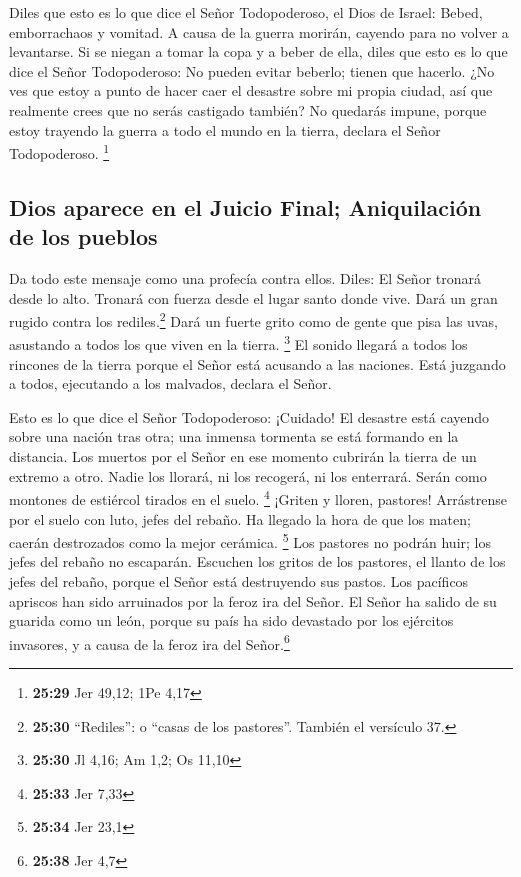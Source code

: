  Diles que esto es lo que dice el Señor Todopoderoso, el
Dios de Israel: Bebed, emborrachaos y vomitad. A causa de la guerra
morirán, cayendo para no volver a levantarse.  Si se
niegan a tomar la copa y a beber de ella, diles que esto es lo que dice
el Señor Todopoderoso: No pueden evitar beberlo; tienen que hacerlo.
 ¿No ves que estoy a punto de hacer caer el desastre
sobre mi propia ciudad, así que realmente crees que no serás castigado
también? No quedarás impune, porque estoy trayendo la guerra a todo el
mundo en la tierra, declara el Señor Todopoderoso. \footnote{\textbf{25:29}
  Jer 49,12; 1Pe 4,17}

\hypertarget{dios-aparece-en-el-juicio-final-aniquilaciuxf3n-de-los-pueblos}{%
\subsection{Dios aparece en el Juicio Final; Aniquilación de los
pueblos}\label{dios-aparece-en-el-juicio-final-aniquilaciuxf3n-de-los-pueblos}}

 Da todo este mensaje como una profecía contra ellos.
Diles: El Señor tronará desde lo alto. Tronará con fuerza desde el lugar
santo donde vive. Dará un gran rugido contra los rediles.\footnote{\textbf{25:30}
  ``Rediles'': o ``casas de los pastores''. También el versículo 37.}
Dará un fuerte grito como de gente que pisa las uvas, asustando a todos
los que viven en la tierra. \footnote{\textbf{25:30} Jl 4,16; Am 1,2; Os
  11,10}  El sonido llegará a todos los rincones de la
tierra porque el Señor está acusando a las naciones. Está juzgando a
todos, ejecutando a los malvados, declara el Señor.

 Esto es lo que dice el Señor Todopoderoso: ¡Cuidado! El
desastre está cayendo sobre una nación tras otra; una inmensa tormenta
se está formando en la distancia.  Los muertos por el
Señor en ese momento cubrirán la tierra de un extremo a otro. Nadie los
llorará, ni los recogerá, ni los enterrará. Serán como montones de
estiércol tirados en el suelo. \footnote{\textbf{25:33} Jer 7,33}
 ¡Griten y lloren, pastores! Arrástrense por el suelo con
luto, jefes del rebaño. Ha llegado la hora de que los maten; caerán
destrozados como la mejor cerámica. \footnote{\textbf{25:34} Jer 23,1}
 Los pastores no podrán huir; los jefes del rebaño no
escaparán.  Escuchen los gritos de los pastores, el
llanto de los jefes del rebaño, porque el Señor está destruyendo sus
pastos.  Los pacíficos apriscos han sido arruinados por
la feroz ira del Señor.  El Señor ha salido de su guarida
como un león, porque su país ha sido devastado por los ejércitos
invasores, y a causa de la feroz ira del Señor.\footnote{\textbf{25:38}
  Jer 4,7}

